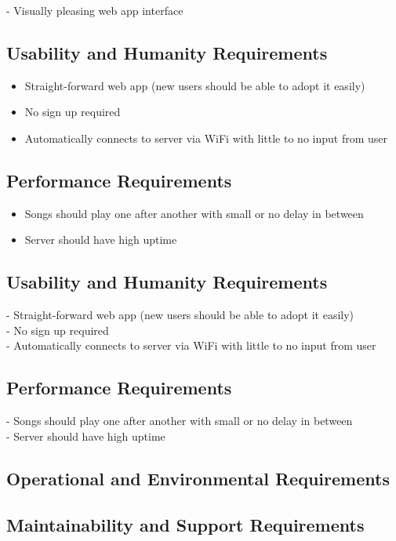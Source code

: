 \documentclass[12pt, titlepage]{article}
\begin{document}
- Visually pleasing web app interface


\subsection{Usability and Humanity Requirements}
\begin{itemize}
\item Straight-forward web app (new users should be able to adopt it easily)
\item No sign up required
\item Automatically connects to server via WiFi with little to no input from user
\end{itemize}
\subsection{Performance Requirements}
\begin{itemize}
\item Songs should play one after another with small or no delay in between
\item Server should have high uptime
\end{itemize}


\subsection{Usability and Humanity Requirements}

- Straight-forward web app (new users should be able to adopt it easily) \\
- No sign up required \\
- Automatically connects to server via WiFi with little to no input from user \\

\subsection{Performance Requirements}

- Songs should play one after another with small or no delay in between \\
- Server should have high uptime \\

\subsection{Operational and Environmental Requirements}

\subsection{Maintainability and Support Requirements}
\end{document}
